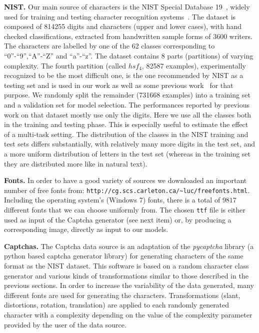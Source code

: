 \documentclass{article} %
\begin{document}
{\bf NIST.}
Our main source of characters is the NIST Special Database 19~\citep{Grother-1995}, 
widely used for training and testing character
recognition systems~\citep{Granger+al-2007,Cortes+al-2000,Oliveira+al-2002-short,Milgram+al-2005}. 
The dataset is composed of 814255 digits and characters (upper and lower cases), with hand checked classifications,
extracted from handwritten sample forms of 3600 writers. The characters are labelled by one of the 62 classes 
corresponding to ``0''-``9'',``A''-``Z'' and ``a''-``z''. The dataset contains 8 parts (partitions) of varying complexity. 
The fourth partition (called $hsf_4$, 82587 examples), 
experimentally recognized to be the most difficult one, is the one recommended 
by NIST as a testing set and is used in our work as well as some previous work~\citep{Granger+al-2007,Cortes+al-2000,Oliveira+al-2002-short,Milgram+al-2005}
for that purpose. We randomly split the remainder (731668 examples) into a training set and a validation set for
model selection. 
The performances reported by previous work on that dataset mostly use only the digits.
Here we use all the classes both in the training and testing phase. This is especially
useful to estimate the effect of a multi-task setting.
The distribution of the classes in the NIST training and test sets differs
substantially, with relatively many more digits in the test set, and a more uniform distribution
of letters in the test set (whereas in the training set they are distributed
more like in natural text).

{\bf Fonts.} 
In order to have a good variety of sources we downloaded an important number of free fonts from:
{\tt http://cg.scs.carleton.ca/\textasciitilde luc/freefonts.html}.
Including the operating system's (Windows 7) fonts, there is a total of $9817$ different fonts that we can choose uniformly from.
The chosen {\tt ttf} file is either used as input of the Captcha generator (see next item) or, by producing a corresponding image, 
directly as input to our models.
\vspace*{-1mm}

{\bf Captchas.}
The Captcha data source is an adaptation of the \emph{pycaptcha} library (a python based captcha generator library) for 
generating characters of the same format as the NIST dataset. This software is based on
a random character class generator and various kinds of transformations similar to those described in the previous sections. 
In order to increase the variability of the data generated, many different fonts are used for generating the characters. 
Transformations (slant, distortions, rotation, translation) are applied to each randomly generated character with a complexity
depending on the value of the complexity parameter provided by the user of the data source. 
\vspace*{-1mm}
\end{document}
